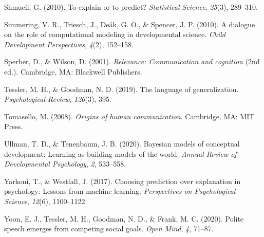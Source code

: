 \documentclass[
  man,floatsintext]{apa6}
\newlength{\cslhangindent}
\newlength{\cslentryspacingunit} %
\newenvironment{CSLReferences}[2] %
 {%
  \setlength{\parindent}{0pt}
  \ifodd #1
  \let\oldpar\par
  \def\par{\hangindent=\cslhangindent\oldpar}
  \fi
  \setlength{\parskip}{#2\cslentryspacingunit}
 }%
 {}
\begin{document}
\begin{CSLReferences}{1}{0}
\leavevmode{}%
Shmueli, G. (2010). To explain or to predict? \emph{Statistical Science}, \emph{25}(3), 289--310.

\leavevmode{}%
Simmering, V. R., Triesch, J., Deák, G. O., \& Spencer, J. P. (2010). A dialogue on the role of computational modeling in developmental science. \emph{Child Development Perspectives}, \emph{4}(2), 152--158.

\leavevmode{}%
Sperber, D., \& Wilson, D. (2001). \emph{Relevance: Communication and cognition} (2nd ed.). Cambridge, MA: Blackwell Publishers.

\leavevmode{}%
Tessler, M. H., \& Goodman, N. D. (2019). The language of generalization. \emph{Psychological Review}, \emph{126}(3), 395.

\leavevmode{}%
Tomasello, M. (2008). \emph{Origins of human communication}. Cambridge, MA: MIT Press.

\leavevmode{}%
Ullman, T. D., \& Tenenbaum, J. B. (2020). Bayesian models of conceptual development: Learning as building models of the world. \emph{Annual Review of Developmental Psychology}, \emph{2}, 533--558.

\leavevmode{}%
Yarkoni, T., \& Westfall, J. (2017). Choosing prediction over explanation in psychology: Lessons from machine learning. \emph{Perspectives on Psychological Science}, \emph{12}(6), 1100--1122.

\leavevmode{}%
Yoon, E. J., Tessler, M. H., Goodman, N. D., \& Frank, M. C. (2020). Polite speech emerges from competing social goals. \emph{Open Mind}, \emph{4}, 71--87.

\end{CSLReferences}

\endgroup
\end{document}
